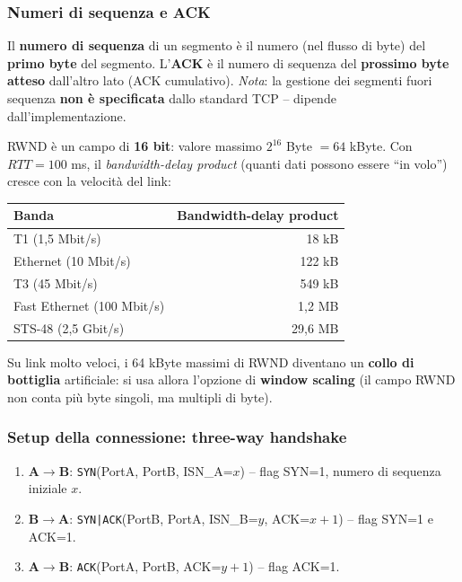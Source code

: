 \documentclass[12pt, a4paper]{article}
\begin{document}
\subsubsection{Numeri di sequenza e ACK}

Il \textbf{numero di sequenza} di un segmento è il numero (nel flusso di byte) del \textbf{primo byte} del segmento. L'\textbf{ACK} è il numero di sequenza del \textbf{prossimo byte atteso} dall'altro lato (ACK cumulativo). \textit{Nota}: la gestione dei segmenti fuori sequenza \textbf{non è specificata} dallo standard TCP -- dipende dall'implementazione.

\begin{tcolorbox}[colback=cyan!5, colframe=blue!40!black, title=\textbf{RWND e bandwidth-delay product}]
RWND è un campo di \textbf{16 bit}: valore massimo $2^{16}$ Byte $=64$ kByte. Con $RTT=100$ ms, il \textit{bandwidth-delay product} (quanti dati possono essere ``in volo'') cresce con la velocità del link:
\begin{center}
\begin{tabular}{lr}
\toprule
\textbf{Banda} & \textbf{Bandwidth-delay product} \\
\midrule
T1 (1,5 Mbit/s) & 18 kB \\
Ethernet (10 Mbit/s) & 122 kB \\
T3 (45 Mbit/s) & 549 kB \\
Fast Ethernet (100 Mbit/s) & 1,2 MB \\
STS-48 (2,5 Gbit/s) & 29,6 MB \\
\bottomrule
\end{tabular}
\end{center}
Su link molto veloci, i 64 kByte massimi di RWND diventano un \textbf{collo di bottiglia} artificiale: si usa allora l'opzione di \textbf{window scaling} (il campo RWND non conta più byte singoli, ma multipli di byte).
\end{tcolorbox}

\subsubsection{Setup della connessione: three-way handshake}

\begin{enumerate}
    \item \textbf{A$\to$B}: \texttt{SYN}(PortA, PortB, ISN\_A=$x$) -- flag SYN=1, numero di sequenza iniziale $x$.
    \item \textbf{B$\to$A}: \texttt{SYN|ACK}(PortB, PortA, ISN\_B=$y$, ACK=$x{+}1$) -- flag SYN=1 e ACK=1.
    \item \textbf{A$\to$B}: \texttt{ACK}(PortA, PortB, ACK=$y{+}1$) -- flag ACK=1.
\end{enumerate}
\end{document}
